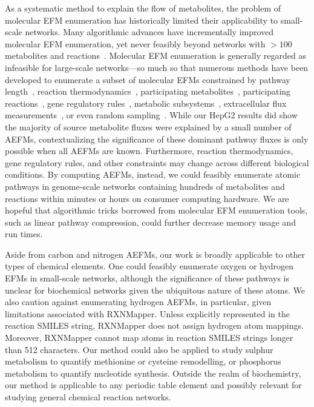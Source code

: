 \documentclass[12pt]{article}
\begin{document}
As a systematic method to explain the flow of metabolites, the problem of
molecular EFM enumeration has historically limited their applicability to
small-scale networks. Many algorithmic advances have incrementally
improved molecular EFM enumeration, yet never feasibly beyond networks
with $>100$ metabolites and
reactions~\citep{KampAxelvon2006M5fa,TerzerMarco2008Lcoe,vanKlinkenJanBert2016Faet}.
Molecular EFM enumeration is generally regarded as infeasible for
large-scale networks---so much so that numerous methods have been
developed to enumerate a subset of molecular EFMs constrained by pathway
length~\citep{deFigueiredoLuisF2009Ctse}, reaction
thermodynamics~\citep{GerstlMatthiasP2015Mief}, participating
metabolites~\citep{PeyJon2014Dcoe}, participating
reactions~\citep{KaletaChristoph2009Ctwb}, gene regulatory
rules~\citep{JungreuthmayerChristian2013rSue}, metabolic
subsystems~\citep{SchusterS2002Etps,SchwartzJean-Marc2007Omfa},
extracellular flux
measurements~\citep{SoonsZitaITA2011Iomm,JungersRaphaelM.2011Fcom}, or
even random sampling~\citep{MachadoDaniel2012Rsoe}. While our HepG2
results did show the majority of source metabolite fluxes were explained
by a small number of AEFMs, contextualizing the significance of these
dominant pathway fluxes is only possible when all AEFMs are known.
Furthermore, reaction thermodynamics, gene regulatory rules, and other
constraints may change across different biological conditions. By
computing AEFMs, instead, we could feasibly enumerate atomic pathways in
genome-scale networks containing hundreds of metabolites and reactions
within minutes or hours on consumer computing hardware. We are hopeful
that algorithmic tricks borrowed from molecular EFM enumeration tools,
such as linear pathway compression, could further decrease memory usage
and run times.

Aside from carbon and nitrogen AEFMs, our work is broadly applicable to
other types of chemical elements. One could feasibly enumerate oxygen or
hydrogen EFMs in small-scale networks, although the significance of these
pathways is unclear for biochemical networks given the ubiquitous nature
of these atoms. We also caution against enumerating hydrogen AEFMs, in
particular, given limitations associated with RXNMapper. Unless explicitly
represented in the reaction SMILES string, RXNMapper does not assign
hydrogen atom mappings. Moreover, RXNMapper cannot map
atoms in reaction SMILES strings longer than 512 characters. Our method
could also be applied to study sulphur metabolism to quantify methionine
or cysteine remodelling, or phosphorus metabolism to quantify nucleotide
synthesis. Outside the realm of biochemistry, our method is applicable to
any periodic table element and possibly relevant for studying general
chemical reaction networks. 
\end{document}
